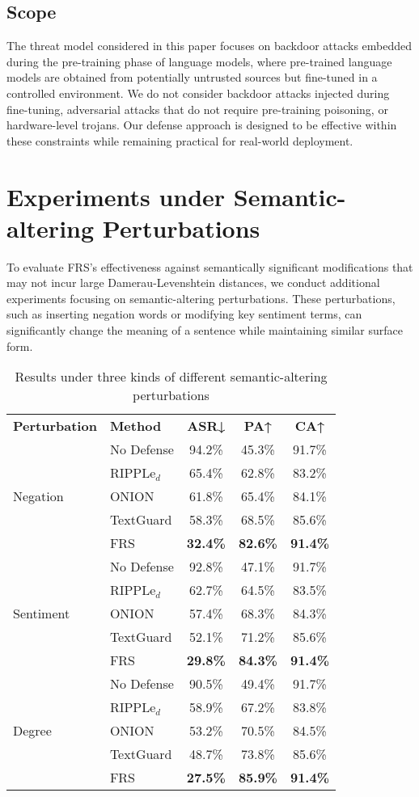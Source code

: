 \subsection{Scope}
The threat model considered in this paper focuses on backdoor attacks embedded during the pre-training phase of language models, where pre-trained language models are obtained from potentially untrusted sources but fine-tuned in a controlled environment. We do not consider backdoor attacks injected during fine-tuning, adversarial attacks that do not require pre-training poisoning, or hardware-level trojans. Our defense approach is designed to be effective within these constraints while remaining practical for real-world deployment.


\section{Experiments under Semantic-altering Perturbations}
To evaluate FRS's effectiveness against semantically significant modifications that may not incur large Damerau-Levenshtein distances, we conduct additional experiments focusing on semantic-altering perturbations. These perturbations, such as inserting negation words or modifying key sentiment terms, can significantly change the meaning of a sentence while maintaining similar surface form.

\begin{table}[h]
\centering
\caption{Results under three kinds of different semantic-altering perturbations}
\label{tab:semantic_results}
\begin{tabular}{llccc}
\toprule
\textbf{Perturbation} & \textbf{Method} & \textbf{ASR↓} & \textbf{PA↑} & \textbf{CA↑} \\
\cmidrule(r){1-5}
\multirow{5}{*}{Negation} 
& No Defense & 94.2\% & 45.3\% & 91.7\% \\
& RIPPLe$_d$ & 65.4\% & 62.8\% & 83.2\% \\
& ONION & 61.8\% & 65.4\% & 84.1\% \\
& TextGuard & 58.3\% & 68.5\% & 85.6\% \\
& FRS & \textbf{32.4\%} & \textbf{82.6\%} & \textbf{91.4\%} \\
\cmidrule(r){1-5}
\multirow{5}{*}{Sentiment} 
& No Defense & 92.8\% & 47.1\% & 91.7\% \\
& RIPPLe$_d$ & 62.7\% & 64.5\% & 83.5\% \\
& ONION & 57.4\% & 68.3\% & 84.3\% \\
& TextGuard & 52.1\% & 71.2\% & 85.6\% \\
& FRS & \textbf{29.8\%} & \textbf{84.3\%} & \textbf{91.4\%} \\
\cmidrule(r){1-5}
\multirow{5}{*}{Degree} 
& No Defense & 90.5\% & 49.4\% & 91.7\% \\
& RIPPLe$_d$ & 58.9\% & 67.2\% & 83.8\% \\
& ONION & 53.2\% & 70.5\% & 84.5\% \\
& TextGuard & 48.7\% & 73.8\% & 85.6\% \\
& FRS & \textbf{27.5\%} & \textbf{85.9\%} & \textbf{91.4\%} \\
\bottomrule
\end{tabular}
\end{table}

